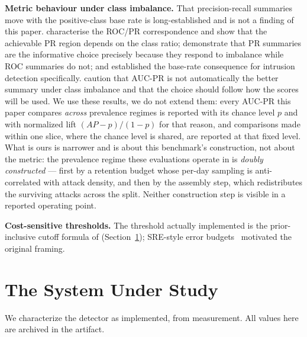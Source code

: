 \documentclass[manuscript,screen,nonacm]{acmart}
\begin{document}
\textbf{Metric behaviour under class imbalance.} That precision-recall
summaries move with the positive-class base rate is long-established and is not
a finding of this paper. \citet{davis2006prroc} characterise
the ROC/PR correspondence and show that the achievable PR region depends on the
class ratio; \citet{saito2015prplot} demonstrate that PR
summaries are the informative choice precisely because they respond to
imbalance while ROC summaries do not; and \citet{axelsson2000baserate}
established the base-rate consequence for intrusion detection specifically.
\citet{mcdermott2024closerlook} caution that AUC-PR is not
automatically the better summary under class imbalance and that the choice
should follow how the scores will be used. We
use these results, we do not extend them: every AUC-PR this paper compares
\emph{across} prevalence regimes is reported with its chance level $p$ and with
normalized lift $(AP-p)/(1-p)$ for that reason, and comparisons made within one
slice, where the chance level is shared, are reported at that fixed level. What is ours is narrower and is about this benchmark's
construction, not about the metric: the prevalence regime these evaluations
operate in is \emph{doubly constructed} --- first by a retention budget whose
per-day sampling is anti-correlated with attack density, and then by the
assembly step, which redistributes the surviving attacks across the split.
Neither construction step is visible in a reported operating point.

\textbf{Cost-sensitive thresholds.} The threshold actually implemented is the
prior-inclusive cutoff formula of \citet{elkan2001cost}
(Section~\ref{sec:detector}); SRE-style error budgets~\citep{beyer2016sre}
motivated the original framing.

\section{The System Under Study}
\label{sec:detector}

We characterize the detector as implemented, from measurement. All values here
are archived in the artifact.
\end{document}
